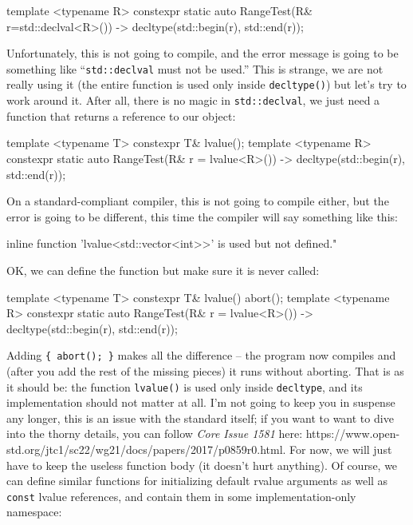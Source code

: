 \begin{code}
template <typename R>
constexpr static auto RangeTest(R& r=std::declval<R>()) ->
  decltype(std::begin(r), std::end(r));
\end{code}

Unfortunately, this is not going to compile, and the error message is going to be something like ``\texttt{std::declval} must not be used.'' This is strange, we are not really using it (the entire function is used only inside \texttt{decltype()}) but let's try to work around it. After all, there is no magic in \texttt{std::declval}, we just need a function that returns a reference to our object:

\begin{code}
template <typename T> constexpr T& lvalue();
template <typename R>
constexpr static auto RangeTest(R& r = lvalue<R>()) ->
  decltype(std::begin(r), std::end(r));
\end{code}

On a standard-compliant compiler, this is not going to compile either, but the error is going to be different, this time the compiler will say something like this:

\begin{code}
inline function 'lvalue<std::vector<int>>' is used but not defined."
\end{code}

OK, we can define the function but make sure it is never called:

\begin{code}
template <typename T> constexpr T& lvalue() { abort(); }
template <typename R>
constexpr static auto RangeTest(R& r = lvalue<R>()) ->
  decltype(std::begin(r), std::end(r));
\end{code}

Adding \texttt{\{\ abort();\ \}} makes all the difference -- the program now compiles and (after you add the rest of the missing pieces) it runs without aborting. That is as it should be: the function \texttt{lvalue()} is used only inside \texttt{decltype}, and its implementation should not matter at all. I'm not going to keep you in suspense any longer, this is an issue with the standard itself; if you want to want to dive into the thorny details, you can follow \emph{Core Issue 1581} here: https://www.open-std.org/jtc1/sc22/wg21/docs/papers/2017/p0859r0.html. For now, we will just have to keep the useless function body (it doesn't hurt anything). Of course, we can define similar functions for initializing default rvalue arguments as well as \texttt{const} lvalue references, and contain them in some implementation-only namespace:

